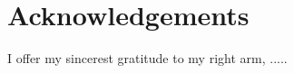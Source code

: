 \pagestyle{empty}
\section*{Acknowledgements}

I offer my sincerest gratitude to my right arm, .....